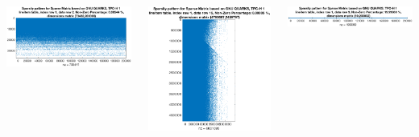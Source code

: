 \documentclass{beamer}
\begin{document}
\begin{frame}
\begin{columns}
\begin{column}{0.3\textwidth}
\includegraphics[width=\columnwidth]{images/tpc-h-1_lineitem_1_2.eps}
\end{column}
\begin{column}{0.3\textwidth}
\includegraphics[width=\columnwidth]{images/tpc-h-1_lineitem_1_15.eps}
\end{column}
\begin{column}{0.3\textwidth}
\includegraphics[width=\columnwidth]{images/tpc-h-1_lineitem_1_9.eps}
\end{column}
\end{columns}

\end{frame}
\end{document}
